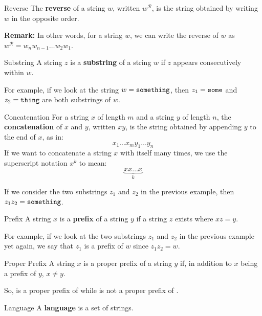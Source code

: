 \documentclass[letterpaper]{article}
\begin{document}
\begin{definition}{Reverse}{}
    The \textbf{reverse} of a string $w$, written $w^{\mathcal{R}}$, is the string obtained by writing $w$ in the opposite order.
\end{definition}
\textbf{Remark:} In other words, for a string $w$, we can write the reverse of $w$ as $w^{\mathcal{R}} = w_n w_{n - 1} \dots w_{2} w_{1}$. 

\begin{definition}{Substring}{}
    A string $z$ is a \textbf{substring} of a string $w$ if $z$ appears consecutively within $w$.
\end{definition}
For example, if we look at the string $w = \texttt{something}$, then $z_1 = \texttt{some}$ and $z_2 = \texttt{thing}$ are both substrings of $w$. 

\begin{definition}{Concatenation}{}
    For a string $x$ of length $m$ and a string $y$ of length $n$, the \textbf{concatenation} of $x$ and $y$, written $xy$, is the string obtained by appending $y$ to the end of $x$, as in: 
    \[x_1 \dots x_m y_1 \dots y_n\]
    If we want to concatenate a string $x$ with itself many times, we use the superscript notation $x^k$ to mean: 
    \[\underbrace{xx \dots x}_{k}\]
\end{definition}
If we consider the two substrings $z_1$ and $z_2$ in the previous example, then $z_1 z_2 = \texttt{something}$. 


\begin{definition}{Prefix}{}
    A string $x$ is a \textbf{prefix} of a string $y$ if a string $z$ exists where $xz = y$.
\end{definition}
For example, if we look at the two substrings $z_1$ and $z_2$ in the previous example yet again, we say that $z_1$ is a prefix of $w$ since $z_1 z_2 = w$. 

\begin{definition}{Proper Prefix}{}
    A string $x$ is a proper prefix of a string $y$ if, in addition to $x$ being a prefix of $y$, $x \neq y$.
\end{definition}
So,  is a proper prefix of  while  is not a proper prefix of .

\begin{definition}{Language}{}
    A \textbf{language} is a set of strings. 
\end{definition}
\end{document}

